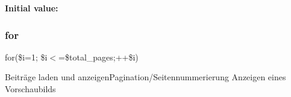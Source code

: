 {\bfseries Initial value\+:}
\begin{DoxyCode}{0}
\DoxyCodeLine{\{}

\end{DoxyCode}
\mbox{\label{show_8php_a80c68fef22aea95c13a63061dcbb9e25}} 
\subsubsection{\texorpdfstring{for}{for}}
{\footnotesize\ttfamily for(\$i=1; \$i$<$=\$total\+\_\+pages;++\$i)}

Beiträge laden und anzeigen\+Pagination/\+Seitennummerierung Anzeigen eines Vorschaubilds